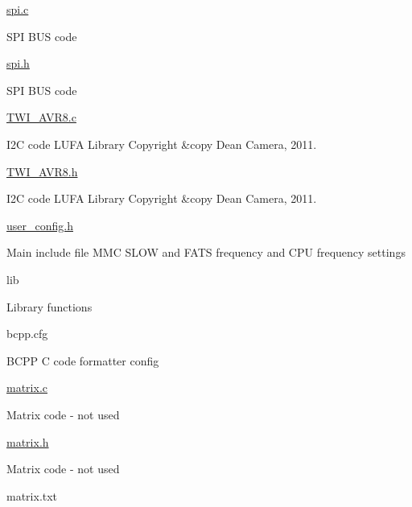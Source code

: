 \begin{DoxyItemize}
\begin{DoxyItemize}
\item \hyperlink{spi_8c}{spi.\+c}
\begin{DoxyItemize}
\item S\+PI B\+US code
\end{DoxyItemize}
\item \hyperlink{spi_8h}{spi.\+h}
\begin{DoxyItemize}
\item S\+PI B\+US code
\end{DoxyItemize}
\item \hyperlink{TWI__AVR8_8c}{T\+W\+I\+\_\+\+A\+V\+R8.\+c}
\begin{DoxyItemize}
\item I2C code L\+U\+FA Library Copyright \&copy Dean Camera, 2011.
\end{DoxyItemize}
\item \hyperlink{TWI__AVR8_8h}{T\+W\+I\+\_\+\+A\+V\+R8.\+h}
\begin{DoxyItemize}
\item I2C code L\+U\+FA Library Copyright \&copy Dean Camera, 2011.
\end{DoxyItemize}
\item \hyperlink{user__config_8h}{user\+\_\+config.\+h}
\begin{DoxyItemize}
\item Main include file M\+MC S\+L\+OW and F\+A\+TS frequency and C\+PU frequency settings
\end{DoxyItemize}
\end{DoxyItemize}
\item lib
\begin{DoxyItemize}
\item Library functions
\item bcpp.\+cfg
\begin{DoxyItemize}
\item B\+C\+PP C code formatter config
\end{DoxyItemize}
\item \hyperlink{matrix_8c}{matrix.\+c}
\begin{DoxyItemize}
\item Matrix code -\/ not used
\end{DoxyItemize}
\item \hyperlink{matrix_8h}{matrix.\+h}
\begin{DoxyItemize}
\item Matrix code -\/ not used
\end{DoxyItemize}
\item matrix.\+txt
\begin{DoxyItemize}

\end{DoxyItemize}
\end{DoxyItemize}
\end{DoxyItemize}

